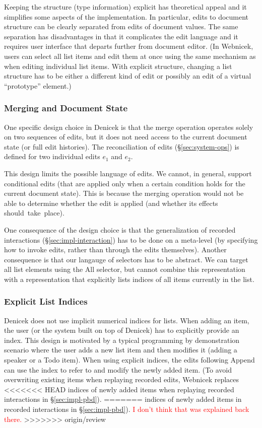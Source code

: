 \documentclass[sigconf,anonymous,screen]{acmart}
\newcommand{\ident}[1]{{\sffamily #1}}
\newcommand{\note}[1]{\textcolor{red}{#1}}
\begin{document}
Keeping the structure (type information) explicit has theoretical appeal and it simplifies some
aspects of the implementation. In particular, edits to document structure can be clearly separated
from edits of document values. The same separation has disadvantages in that it complicates the
edit language and it requires user interface that departs further from document editor.
(In Webnicek, users can select all list items and edit them at once using the same mechanism as
when editing individual list items. With explicit structure, changing a list structure has to be
either a different kind of edit or possibly an edit of a virtual ``prototype'' element.)

\subsubsection*{Merging and Document State}
One specific design choice in Denicek is that the merge operation operates solely on two
sequences of edits, but it does not need access to the current document state (or full edit
histories). The reconciliation of edits (\S\ref{sec:system-ops}) is defined for two individual
edits $e_1$ and $e_2$.

This design limits the possible language of edits. We cannot, in general, support
conditional edits (that are applied only when a certain condition holds for
the current document state). This is because the merging operation would not be able to
determine whether the edit is applied (and whether its effects should~take~place).

One consequence of the design choice is that the generalization of recorded interactions (\S\ref{sec:impl-interaction}) has to
be done on a meta-level (by specifying how to invoke edits, rather than through the edits themselves).
Another consequence is that our langauge of selectors has to be abstract.
We can target all list elements using the \ident{All} selector, but cannot combine this
representation with a representation that explicitly lists indices of all items currently in the list.

\subsubsection*{Explicit List Indices}
Denicek does not use implicit numerical indices for lists. When adding an item, the
user (or the system built on top of Denicek) has to explicitly provide an index. This design
is motivated by a typical programming by demonstration scenario where the user adds a
new list item and then modifies it (adding a speaker or a Todo item). When using explicit indices,
the edits following \ident{Append} can use the index to refer to and modify the newly added
item. (To avoid overwriting existing items when replaying recorded edits, Webnicek replaces
<<<<<<< HEAD
indices of newly added items when replaying recorded interactions in \S\ref{sec:impl-pbd}).
=======
indices of newly added items in recorded interactions in \S\ref{sec:impl-pbd}). \note{I don't think that was explained back there.}
>>>>>>> origin/review
\end{document}
